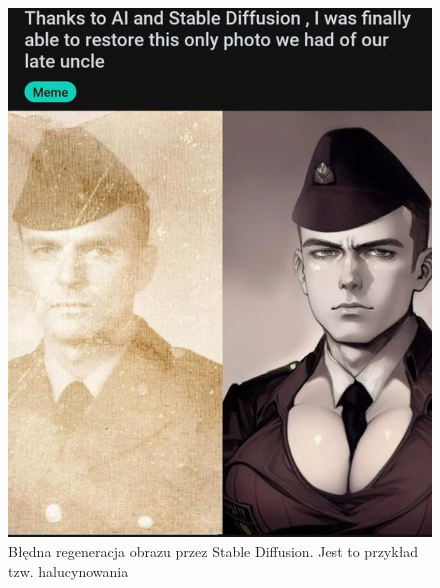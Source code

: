 \begin{figure}
    \includegraphics[width=\linewidth]{img/falied-image-restoration}
    \centering
    \caption{ Błędna regeneracja obrazu przez Stable Diffusion. Jest to przykład tzw. halucynowania}
    \label{img:falied-restoration}
\end{figure}


